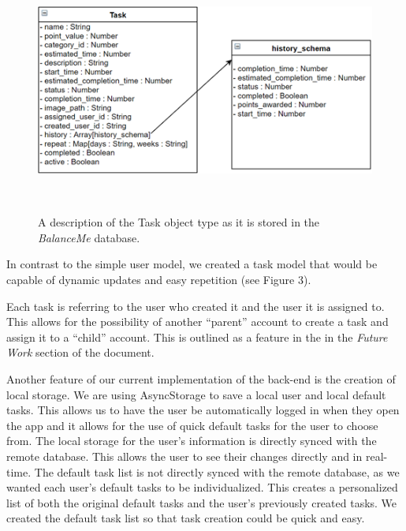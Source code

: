\documentclass{sigchi}
\begin{document}
\begin{figure}
\centering
  \includegraphics[width=1.0\columnwidth]{figures/task}
  \caption{A description of the Task object type as it is stored in the
	\textit{BalanceMe} database. }~\label{fig:figure3}
\end{figure}

In contrast to the simple user model, we created a task model that would be
capable of dynamic updates and easy repetition (see Figure 3).

Each task is referring to the user who created it and the user it is assigned
to. This allows for the possibility of another ``parent'' account to create a
task and assign it to a ``child'' account. This is outlined as a feature in the
in the \textit{Future Work} section of the document.

Another feature of our current implementation of the back-end is the creation
of local storage. We are using AsyncStorage to save a local user and local
default tasks. This allows us to have the user be automatically logged in when
they open the app and it allows for the use of quick default tasks for the user
to choose from. The local storage for the user’s information is directly synced
with the remote database. This allows the user to see their changes directly
and in real-time. The default task list is not directly synced with the remote
database, as we wanted each user’s default tasks to be individualized. This
creates a personalized list of both the original default tasks and the user’s
previously created tasks. We created the default task list so that task
creation could be quick and easy.
\end{document}
